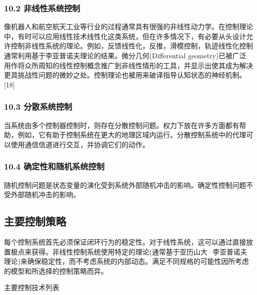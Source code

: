 \subsubsection{10.2 非线性系统控制}

像机器人和航空航天工业等行业的过程通常具有很强的非线性动力学。在控制理论中，有时可以应用线性技术线性化这类系统，但在许多情况下，有必要从头设计允许控制非线性系统的理论。例如，反馈线性化，反推，滑模控制，轨迹线性化控制通常利用基于李亚普诺夫理论的结果。微分几何(Differential geometry)已被广泛用作将众所周知的线性控制概念推广到非线性情形的工具，并显示出使其成为解决更具挑战性问题的微妙之处。控制理论也被用来破译指导认知状态的神经机制。[18]

\subsubsection{10.3 分散系统控制}

当系统由多个控制器控制时，则存在分散控制问题。权力下放在许多方面都有帮助，例如，它有助于控制系统在更大的地理区域内运行。分散控制系统中的代理可以使用通信信道进行交互，并协调它们的动作。

\subsubsection{10.4 确定性和随机系统控制}

随机控制问题是状态变量的演化受到系统外部随机冲击的影响。确定性控制问题不受外部随机冲击的影响。

\subsection{主要控制策略}

每个控制系统首先必须保证闭环行为的稳定性。对于线性系统，这可以通过直接放置极点来获得。非线性控制系统使用特定的理论(通常基于亚历山大·李亚普诺夫理论)来确保稳定性，而不考虑系统的内部动态。满足不同规格的可能性因所考虑的模型和所选择的控制策略而异。

主要控制技术列表

